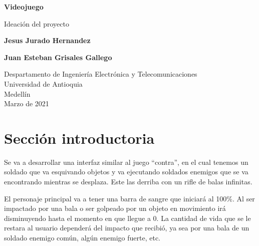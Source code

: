 \documentclass{article}
\begin{document}
\begin{titlepage}
    \begin{center}
        \vspace*{1cm}
            
        \Huge
        \textbf{Videojuego}
            
        \vspace{0.5cm}
        \LARGE
        Ideación del proyecto
            
        \vspace{1.5cm}
            
        \textbf{Jesus Jurado Hernandez}
        \vspace{0.5 cm}
        
        \textbf{Juan Esteban Grisales Gallego}
        
        
            
        \vfill
        
        \vspace{0.8cm}
            
        \Large
        Despartamento de Ingeniería Electrónica y Telecomunicaciones\\
        Universidad de Antioquia\\
        Medellín\\
        Marzo de 2021
            
    \end{center}
\end{titlepage}

\tableofcontents
\newpage
\section{Sección introductoria}\label{intro}

Se va a desarrollar una interfaz similar al juego “contra”, en el cual tenemos un soldado que va esquivando objetos y va ejecutando soldados enemigos que se va encontrando mientras se desplaza. Este las derriba con un rifle de balas infinitas. 

\vspace{0.8cm}

El personaje principal va a tener una barra de sangre que iniciará al 100\%. Al ser impactado por una bala o ser golpeado por un objeto en movimiento irá disminuyendo hasta el momento en que llegue a 0. La cantidad de vida que se le restara al usuario dependerá del impacto que recibió, ya sea por una bala de un soldado enemigo común, algún enemigo fuerte, etc.
\end{document}
